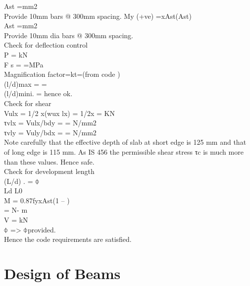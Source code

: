 Ast		=mm2\\
Provide 10mm bars @ 300mm spacing.
My (+ve)	=xAst(Ast)\\
Ast 		=mm2\\
Provide 10mm dia bars @ 300mm spacing.\\
Check for deflection control\\
P	 = kN\\
F s	= 	=MPa\\
Magnification factor=kt=(from code )\\
(l/d)max	= =\\
(l/d)mini.			=	 hence ok.\\
Check for shear\\
Vulx	= 1/2 x(wux lx) 	= 1/2x = KN\\
τvlx  	= Vulx/bdy 		=  = N/mm2\\
τvly  	= Vuly/bdx  		= = N/mm2\\
Note carefully that the effective depth of slab at short edge is 125 mm and that of long edge is 115 mm. As IS 456 the permissible shear stress τc is much more than these values. Hence safe.\\
Check for development length\\
(L/d)	.	= ⏀\\
Ld			L0\\
M	 	= 0.87fyxAst(1 –  )\\
=  N- m\\
V 		=  kN\\
⏀		=> ⏀provided.\\	
Hence the code requirements are satisfied.


\section{Design of Beams}
